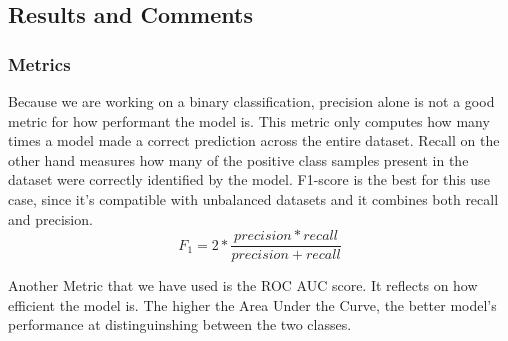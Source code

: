 \documentclass[a4paper,12pt,twoside]{report}
\begin{document}
\subsection{Results and Comments}
\subsubsection{Metrics}
Because we are working on a binary classification, precision alone is not a good metric for how performant the model is. This metric only computes how many times a model made a correct prediction across the entire dataset. Recall on the other hand measures how many of the positive class samples present in the dataset were correctly identified by the model.
F1-score is the best for this use case, since it's compatible with unbalanced datasets and it combines both recall and precision. 
$$ F_1 = 2 * \frac{precision * recall }{precision + recall} $$

Another Metric that we have used is the ROC AUC score. It reflects on how efficient the model is. The higher the Area Under the Curve, the better model's performance at distinguinshing between the two classes.
\end{document}
